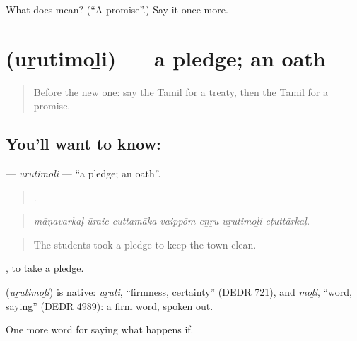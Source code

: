 \begin{tcolorbox}[breakable,colback=teal!4,colframe=teal!35!black,title={Before you move on}]
What does  mean? (\textquotedblleft{}A promise\textquotedblright{}.) Say it once more.
\end{tcolorbox}
\section[\texorpdfstring{\ta{உறுதிமொழி} (uṟutimoḻi)}{உறுதிமொழி (uṟutimoḻi)}]{ (uṟutimoḻi) — a pledge; an oath}

\label{lesson:TA-C387-urutimoli}



\begin{quote}
Before the new one: say the Tamil for a treaty, then the Tamil for a promise.
\end{quote}

\subsection*{You'll want to know: }
\textbf{} — \emph{uṟutimoḻi} — \textquotedblleft{}a pledge; an oath\textquotedblright{}.

\begin{quote}
      .
\end{quote}

\begin{quote}
\emph{māṇavarkaḷ ūraic cuttamāka vaippōm eṉṟu uṟutimoḻi eṭuttārkaḷ.}
\end{quote}

\begin{quote}
The students took a pledge to keep the town clean.
\end{quote}

 , to take a pledge.

\begin{cousinweb}
\textbf{} (\emph{uṟutimoḻi}) is native: \emph{uṟuti}, \textquotedblleft{}firmness, certainty\textquotedblright{} (DEDR 721), and \emph{moḻi}, \textquotedblleft{}word, saying\textquotedblright{} (DEDR 4989): a firm word, spoken out.
\end{cousinweb}

\begin{grammarlens}[title={What you've built}]
One more word for saying what happens if.
\end{grammarlens}


